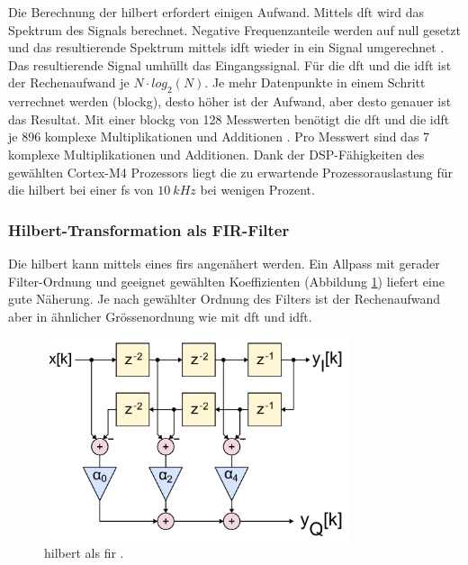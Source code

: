 Die Berechnung der \gls{hilbert} erfordert einigen Aufwand. Mittels \gls{dft} wird das Spektrum des Signals berechnet. Negative Frequenzanteile werden auf null gesetzt und das resultierende Spektrum mittels \gls{idft} wieder in ein Signal umgerechnet \cite{wiki_hilbert}. Das resultierende Signal umhüllt das Eingangssignal. 
Für die \gls{dft} und die \gls{idft} ist der Rechenaufwand je \ensuremath{N \cdot log_2(N)}. Je mehr Datenpunkte in einem Schritt verrechnet werden (\gls{blockg}), desto höher ist der Aufwand, aber desto genauer ist das Resultat. Mit einer \gls{blockg} von 128 Messwerten benötigt die \gls{dft} und die \gls{idft} je 896 komplexe Multiplikationen und Additionen \cite[Kap. 3, S. 48]{dsv1_hilbert}. Pro Messwert sind das 7 komplexe Multiplikationen und Additionen. Dank der DSP-Fähigkeiten des gewählten Cortex\texttrademark -M4 Prozessors liegt die zu erwartende Prozessorauslastung für die \gls{hilbert} bei einer \gls{fs} von \ensuremath{10~kHz} bei wenigen Prozent.

\subsubsection{Hilbert-Transformation als FIR-Filter}
Die \gls{hilbert} kann mittels eines \gls{fir}s angenähert werden. Ein Allpass mit gerader Filter-Ordnung und geeignet gewählten Koeffizienten (Abbildung \ref{fig.hilbertFIR}) liefert eine gute Näherung. Je nach gewählter Ordnung des Filters ist der Rechenaufwand aber in ähnlicher Grössenordnung wie mit \gls{dft} und \gls{idft}.
\begin{figure}
	\centering
		\includegraphics[width=0.8\textwidth]{images/FIR_Hilbert_Transform_Filter.png}
	\caption{\gls{hilbert} als \gls{fir} \cite{wiki_hilbertFIR}.}
	\label{fig.hilbertFIR}
\end{figure}

